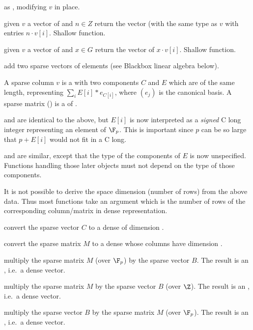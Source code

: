  as , modifying
$v$ in place.

 given $v$ a vector of  and $n\in
Z$ return the vector (with the same type as $v$ with entries $n \cdot v[i]$.
Shallow function.

 given $v$ a vector of  and $x\in
G$ return the vector of $x \cdot v[i]$. Shallow function.

 add two sparse vectors of
 elements (see Blackbox linear algebra below).


A sparse column  $v$ is a  with two components $C$ and $E$
which are  of the same length, representing $\sum_i
E[i]*e_{C[i]}$, where $(e_j)$ is the canonical basis. A sparse matrix
() is a  of .

 and  are identical to the above, but $E[i]$ is now
interpreted as a \emph{signed} C long integer representing an element of
$\F_p$. This is important since $p$ can be so large that $p+E[i]$ would not
fit in a C long.

 and  are similar, except that the type of the components
of $E$ is now unspecified. Functions handling those later objects
must not depend on the type of those components.

It is not possible to derive the space dimension (number of rows) from the
above data. Thus most functions take an argument  which is the
number of rows of the corresponding column/matrix in dense representation.

 convert the sparse vector $C$
to a dense  of dimension .

 convert the sparse matrix $M$
to a dense  whose columns have dimension .

 multiply the sparse matrix $M$
(over $\F_p$) by the sparse vector $B$. The result is an , i.e.~a
dense vector.

 multiply the sparse matrix $M$
by the sparse vector $B$ (over $\Z$). The result is an , i.e.~a
dense vector.

 multiply the sparse vector $B$
by the sparse matrix $M$ (over $\F_p$). The result is an , i.e.~a
dense vector.

